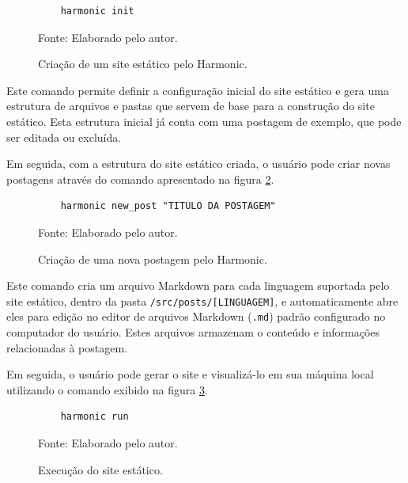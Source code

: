\documentclass[ppginf, pep]{esinucpel}
\newcommand{\code}[1]{\texttt{#1}}
\begin{document}
\begin{figure}[H]
    \centering
    \caption{Criação de um site estático pelo Harmonic.}
    \vspace{5pt}
    \lstset{language=sh}
    \begin{lstlisting}
    harmonic init
    \end{lstlisting}
    Fonte: Elaborado pelo autor.
    \label{fig:comando_harmonic_init}
\end{figure}

Este comando permite definir a configuração inicial do site estático e gera uma estrutura de arquivos e pastas que servem de base para a construção do site estático. Esta estrutura inicial já conta com uma postagem de exemplo, que pode ser editada ou excluída.

Em seguida, com a estrutura do site estático criada, o usuário pode criar novas postagens através do comando apresentado na figura \ref{fig:comando_harmonic_new_post}.

\begin{figure}[H]
    \centering
    \caption{Criação de uma nova postagem pelo Harmonic.}
    \vspace{5pt}
    \lstset{language=sh}
    \begin{lstlisting}
    harmonic new_post "TITULO DA POSTAGEM"
    \end{lstlisting}
    Fonte: Elaborado pelo autor.
    \label{fig:comando_harmonic_new_post}
\end{figure}

Este comando cria um arquivo Markdown para cada linguagem suportada pelo site estático, dentro da pasta \code{/src/posts/[LINGUAGEM]}, e automaticamente abre eles para edição no editor de arquivos Markdown (\code{.md}) padrão configurado no computador do usuário. Estes arquivos armazenam o conteúdo e informações relacionadas à postagem.

Em seguida, o usuário pode gerar o site e visualizá-lo em sua máquina local utilizando o comando exibido na figura \ref{fig:comando_harmonic_run}.

\begin{figure}[H]
    \centering
    \caption{Execução do site estático.}
    \vspace{5pt}
    \lstset{language=sh}
    \begin{lstlisting}
    harmonic run
    \end{lstlisting}
    Fonte: Elaborado pelo autor.
    \label{fig:comando_harmonic_run}
\end{figure}
\end{document}
